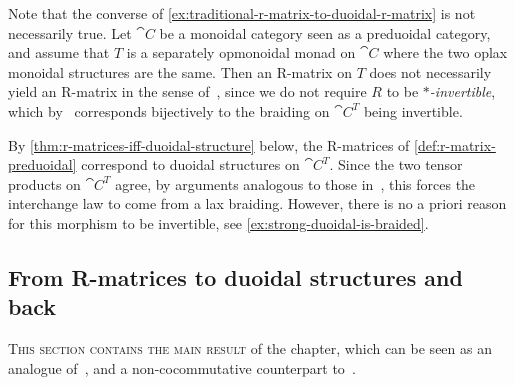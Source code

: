\begin{remark}\label{rmk:star-invertability}
  Note that the converse of \cref{ex:traditional-r-matrix-to-duoidal-r-matrix} is not necessarily true.
  Let \(\cat{C}\) be a monoidal category seen as a preduoidal category,
  and assume that \(T\) is a separately opmonoidal monad on \(\cat{C}\) where the two oplax monoidal
  \newpage\noindent{}structures are the same.
  Then an R\hyp{}matrix on \(T\) does not necessarily yield an R\hyp{}matrix in the sense of~\cite[Section~8.2]{Bruguieres2007},
  since we do not require \(R\) to be \emph{\(*\)\hyp{}invertible},
  which by~\cite[Theorem~8.5]{Bruguieres2007} corresponds bijectively to the braiding on \(\cat{C}^T\) being invertible.

  By \cref{thm:r-matrices-iff-duoidal-structure} below,
  the R\hyp{}matrices of \cref{def:r-matrix-preduoidal} correspond to duoidal structures on \(\cat{C}^T\).
  Since the two tensor products on \(\cat{C}^T\) agree,
  by arguments analogous to those in~\cite[Section~6.3]{Aguiar2010},
  this forces the interchange law to come from a lax braiding.
  However, there is no a priori reason for this morphism to be invertible,
  see \cref{ex:strong-duoidal-is-braided}.
\end{remark}

\subsection{From R-matrices to duoidal structures and back}

\textsc{This section contains the main result}
of the chapter,
which can be seen as an analogue of~\cite[Theorem~8.5]{Bruguieres2007},
and a non-cocommutative counterpart to~\cite[Theorem~7.2]{aguiar18:monad}.

